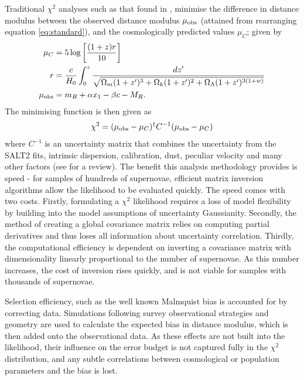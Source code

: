 \documentclass[a4paper,fleqn,usenatbib]{mnras}
\begin{document}
Traditional $\chi^2$ analyses such as that found in \citet{Kowalski2008, Conley2011, Betoule2014}, minimise the difference in distance modulus between the observed distance modulus $\mu_{\rm obs}$ (attained from rearranging equation \eqref{eq:standard}), and the cosmologically predicted values $\mu_C$; given by
\begin{align}
\mu_C &= 5 \log\left[ \frac{(1+z)r}{10} \right]\\
r& =\frac{c}{H_0} \int_0^z \frac{dz'}{\sqrt{ \Omega_m (1+z')^3 + \Omega_k (1 + z')^2 + \Omega_\Lambda (1+z')^{3(1+w)}}} \label{eq:mu0}\\
\mu_{\rm obs} &= m_B + \alpha x_1 - \beta c - M_B. \label{eq:mu1}
\end{align}
The minimising function is then given as
\begin{equation}
\chi^2 = (\mu_{\rm obs} - \mu_C)^\dagger C^{-1} (\mu_{\rm obs} - \mu_C)
\end{equation}
where $C^{-1}$ is an uncertainty matrix that combines the uncertainty from the SALT2 fits, intrinsic dispersion, calibration, dust, peculiar velocity and many other factors (see \citet{Betoule2014} for a review). The benefit this analysis methodology provides is speed - for samples of hundreds of supernovae, efficient matrix inversion algorithms allow the likelihood to be evaluated quickly. The speed comes with two costs. Firstly, formulating a $\chi^2$ likelihood requires a loss of model flexibility by building into the model assumptions of uncertainty Gaussianity. Secondly, the method of creating a global covariance matrix relies on computing partial derivatives and thus loses all information about uncertainty correlation. Thirdly, the computational efficiency is dependent on inverting a covariance matrix with dimensionality linearly proportional to the number of supernovae. As this number increases, the cost of inversion rises quickly, and is not viable for samples with thousands of supernovae.

Selection efficiency, such as the well known Malmquist bias \citep{MalmquistK.G.1922} is accounted for by correcting data. Simulations following survey observational strategies and geometry are used to calculate the expected bias in distance modulus, which is then added onto the observational data. As these effects are not built into the likelihood, their influence on the error budget is not captured fully in the $\chi^2$ distribution, and any subtle correlations between cosmological or population parameters and the bias is lost.
\end{document}
